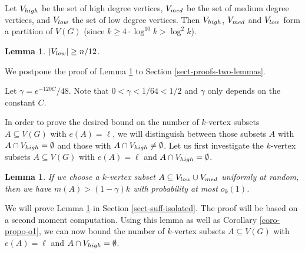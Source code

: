 \documentclass[11pt]{article}
\newtheorem{lemma}[theorem]{Lemma}
\theoremstyle{definition}
\numberwithin{equation}{section}
\begin{document}
Let $V_{\textnormal{high}}$ be the set of high degree vertices, $V_{\textnormal{med}}$ be the set of medium degree vertices, and $V_{\textnormal{low}}$ the set of low degree vertices. Then $V_{\textnormal{high}}$, $V_{\textnormal{med}}$ and $V_{\textnormal{low}}$ form a partition of $V(G)$ (since $k\geq 4\cdot \log^{10} k>\log^2 k$).

\begin{lemma}\label{lemma-Vl-large-enough}$\vert V_{\textnormal{low}}\vert\geq n/12$.
\end{lemma}

We postpone the proof of Lemma \ref{lemma-Vl-large-enough} to Section \ref{sect-proofs-two-lemmas}.

Let $\gamma=e^{-120C}/48$. Note that $0<\gamma<1/64<1/2$ and $\gamma$ only depends on the constant $C$.

In order to prove the desired bound on the number of $k$-vertex subsets $A\subseteq V(G)$ with $e(A)=\ell$, we will distinguish between those subsets $A$ with $A\cap V_{\textnormal{high}}=\emptyset$ and those with $A\cap V_{\textnormal{high}}\neq \emptyset$. Let us first investigate the $k$-vertex subsets $A\subseteq V(G)$ with $e(A)=\ell$ and $A\cap V_{\textnormal{high}}=\emptyset$.

\begin{lemma}\label{lemma-suff-isolated}If we choose a $k$-vertex subset $A\subseteq V_{\textnormal{low}}\cup V_{\textnormal{med}}$ uniformly at random, then we have $m(A)>(1-\gamma)k$ with probability at most $o_k(1)$.
\end{lemma}

We will prove Lemma \ref{lemma-suff-isolated} in Section \ref{sect-suff-isolated}. The proof will be based on a second moment computation. Using this lemma as well as Corollary \ref{coro-propo-o1}, we can now bound the number of $k$-vertex subsets $A\subseteq V(G)$ with $e(A)=\ell$ and $A\cap V_{\textnormal{high}}=\emptyset$.
\end{document}
